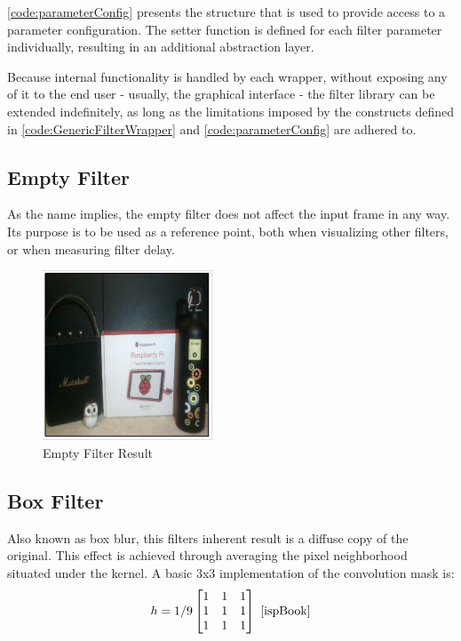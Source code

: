 \cref{code:parameterConfig} presents the structure that is used to provide access to a parameter
configuration. The setter function is defined for each filter parameter individually, resulting in an
additional abstraction layer.

Because internal functionality is handled by each wrapper, without exposing any of it to the end
user - usually, the graphical interface - the filter library can be extended indefinitely, as long as
the limitations imposed by the constructs defined in \cref{code:GenericFilterWrapper} and
\cref{code:parameterConfig} are adhered to.

\subsection{Empty Filter}

As the name implies, the empty filter does not affect the input frame in any way. Its purpose is to be
used as a reference point, both when visualizing other filters, or when measuring filter delay.

\begin{figure}[H]
	\includegraphics[width=0.45\textwidth, height=0.45\textwidth]{resources/Empty_4.png}
	\caption{Empty Filter Result}
\end{figure}

\subsection{Box Filter}

Also known as box blur, this filters inherent result is a diffuse copy of the original. This effect is
achieved through averaging the pixel neighborhood situated under the kernel. A basic 3x3 implementation
of the convolution mask is:
\begin{equation}
	h = 1/9
	\begin{bmatrix}
		1 & 1 & 1 \\
		1 & 1 & 1 \\
		1 & 1 & 1 \\
	\end{bmatrix}
	\text{ \cite{ispBook}}
\end{equation}

